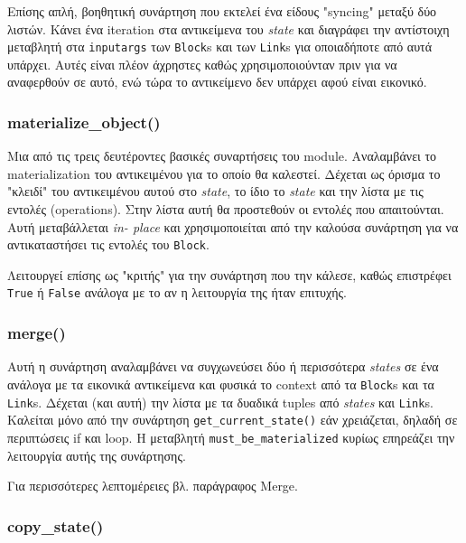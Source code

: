 Επίσης απλή, βοηθητική συνάρτηση που εκτελεί ένα είδους "syncing" μεταξύ δύο
λιστών. Κάνει ένα iteration στα αντικείμενα του \textit{state} και διαγράφει την
αντίστοιχη μεταβλητή στα \texttt{inputargs} των \texttt{Block}s και των
\texttt{Link}s για οποιαδήποτε από αυτά υπάρχει. Αυτές είναι πλέον άχρηστες
καθώς χρησιμοποιούνταν πριν για να αναφερθούν σε αυτό, ενώ τώρα το αντικείμενο
δεν υπάρχει αφού είναι εικονικό.

\subsubsection{materialize\_object()}

Μια από τις τρεις δευτέροντες βασικές συναρτήσεις του module. Αναλαμβάνει το
materialization του αντικειμένου για το οποίο θα καλεστεί. Δέχεται ως όρισμα το
"κλειδί" του αντικειμένου αυτού στο \textit{state}, το ίδιο το \textit{state}
και την λίστα με τις εντολές (operations). Στην λίστα αυτή θα προστεθούν οι
εντολές που απαιτούνται. Αυτή μεταβάλλεται \textit{in- place} και
χρησιμοποιείται από την καλούσα συνάρτηση για να αντικαταστήσει τις εντολές του
\texttt{Block}.

Λειτουργεί επίσης ως "κριτής" για την συνάρτηση που την κάλεσε, καθώς
επιστρέφει \texttt{True} ή \texttt{False} ανάλογα με το αν η λειτουργία της ήταν
επιτυχής.

\subsubsection{merge()}

Αυτή η συνάρτηση αναλαμβάνει να συγχωνεύσει δύο ή περισσότερα \textit{states} σε
ένα ανάλογα με τα εικονικά αντικείμενα και φυσικά το context από τα
\texttt{Block}s και τα \texttt{Link}s. Δέχεται (και αυτή) την λίστα με τα
δυαδικά tuples από \textit{states} και \texttt{Link}s. Καλείται μόνο από την
συνάρτηση \texttt{get\_current\_state()} εάν χρειάζεται, δηλαδή σε περιπτώσεις
if και loop. Η μεταβλητή \texttt{must\_be\_materialized} κυρίως επηρεάζει την
λειτουργία αυτής της συνάρτησης.

Για περισσότερες λεπτομέρειες βλ. παράγραφος Merge.

\subsubsection{copy\_state()}


